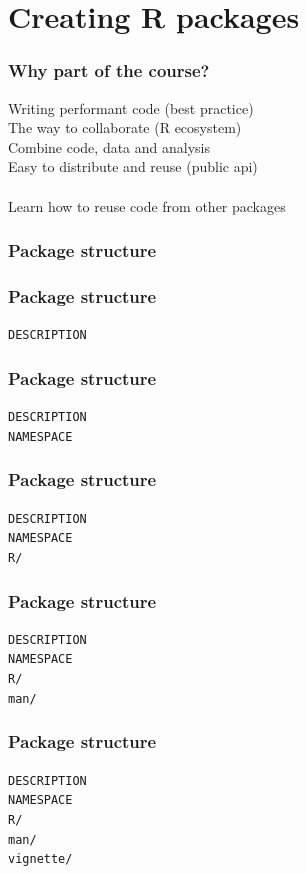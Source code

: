 \documentclass{beamer}
\begin{document}
\section{Creating R packages} 

\begin{frame}
	\frametitle{Why part of the course?}
	Writing performant code (best practice) \\
	The way to collaborate (R ecosystem) \\
	Combine code, data and analysis \\
	Easy to distribute and reuse (public api) \\~\\
	
	Learn how to reuse code from other packages
\end{frame}

\begin{frame}
	\frametitle{Package structure}
\end{frame}

\begin{frame}
	\frametitle{Package structure}
	\texttt{DESCRIPTION}
\end{frame}

\begin{frame}
	\frametitle{Package structure}
	\texttt{DESCRIPTION} \\
	\texttt{NAMESPACE}
\end{frame}

\begin{frame}
	\frametitle{Package structure}
	\texttt{DESCRIPTION} \\
	\texttt{NAMESPACE} \\
	\texttt{R/}
\end{frame}

\begin{frame}
	\frametitle{Package structure}
	\texttt{DESCRIPTION} \\
	\texttt{NAMESPACE} \\
	\texttt{R/} \\
	\texttt{man/}
\end{frame}

\begin{frame}
	\frametitle{Package structure}
	\texttt{DESCRIPTION} \\
	\texttt{NAMESPACE} \\
	\texttt{R/} \\
	\texttt{man/} \\
	\texttt{vignette/}
\end{frame}
\end{document}
